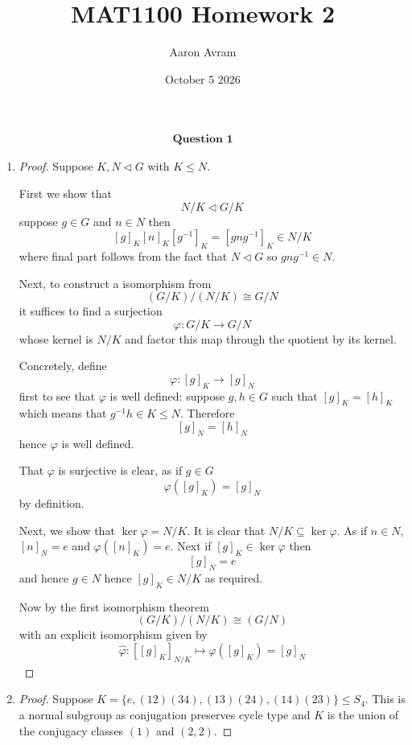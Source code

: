 \documentclass[12pt]{article}
\title{MAT1100 Homework 2}
\author{Aaron Avram}
\date{October 5 2026}
\begin{document}
\newtheorem{definition}{Definition}
\newtheorem{theorem}{Theorem}
\newtheorem{claim}{Claim}
\newtheorem{corollary}{Corollary}

\maketitle

\begin{align*}
    \textbf{Question 1}
\end{align*}

\begin{enumerate}
    \item[(a)]
    \begin{proof}
        Suppose $K, N \lhd G$ with $K \leq N$.

        First we show that
        \[ N/K \lhd G/K \]
        suppose $g \in G$ and $n \in N$ then
        \[ [g]_K[n]_K[g^{-1}]_K = [gng^{-1}]_K \in N/K \]
        where final part follows from the fact that $N \lhd G$ so
        $gng^{-1} \in N$.

        Next, to construct a isomorphism from
        \[ (G/K)/(N/K) \cong G/N \]
        it suffices to find a surjection
        \[ \varphi: G/K \to G/N \]
        whose kernel is $N/K$ and factor this map through the quotient by its kernel.

        Concretely, define
        \[ \varphi: [g]_K \to [g]_N \]
        first to see that $\varphi$ is well defined: suppose $g, h \in G$
        such that $[g]_K = [h]_K$ which means that $g^{-1}h \in K \leq N$.
        Therefore
        \[ [g]_N = [h]_N \]
        hence $\varphi$ is well defined.

        That $\varphi$ is surjective is clear, as if $g \in G$
        \[ \varphi([g]_K) = [g]_N \]
        by definition.

        Next, we show that $\ker \varphi = N/K$. It is clear
        that $N/K \subseteq \ker \varphi$. As if $n \in N$, $[n]_N = e$
        and $\varphi([n]_K) = e$. Next if $[g]_K \in \ker \varphi$
        then
        \[ [g]_N = e \]
        and hence $g \in N$ hence $[g]_K \in N/K$ as required.
        
        Now by the first isomorphism theorem
        \[ (G/K) / (N/K) \cong (G/N) \]
        with an explicit isomorphism given by
        \[ \hat{\varphi}: [[g]_K]_{N/K} \mapsto \varphi([g]_K) = [g]_N \]
    \end{proof}

    \item[(b)]
    \begin{proof}
        Suppose $K = \{ e, (12)(34), (13)(24), (14)(23) \} \leq S_4$.
        This is a normal subgroup as conjugation preserves cycle type
        and $K$ is the union of the conjugacy classes $(1)$ and $(2, 2)$.


\end{proof}
\end{enumerate}
\end{document}
